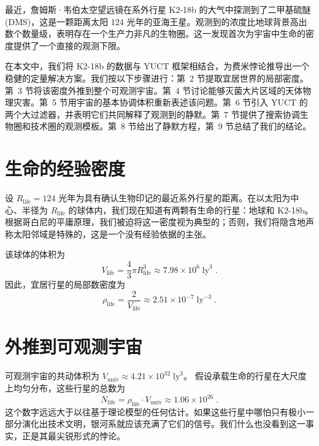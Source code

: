 \documentclass[11pt,a4paper]{article}
\begin{document}
	最近，詹姆斯·韦伯太空望远镜在系外行星 K2-18b 的大气中探测到了二甲基硫醚 (DMS)，这是一颗距离太阳 124 光年的亚海王星。观测到的浓度比地球背景高出数个数量级，表明存在一个生产力非凡的生物圈。这一发现首次为宇宙中生命的密度提供了一个直接的观测下限。
	
	在本文中，我们将 K2-18b 的数据与 YUCT 框架相结合，为费米悖论推导出一个稳健的定量解决方案。我们按以下步骤进行：第~2 节提取宜居世界的局部密度。第~3 节将该密度外推到整个可观测宇宙。第~4 节讨论能够灭菌大片区域的天体物理灾害。第~5 节用宇宙的基本协调体积重新表述该问题。第~6 节引入 YUCT 的两个大过滤器，并表明它们共同解释了观测到的静默。第~7 节提供了搜索协调生物圈和技术圈的观测模板。第~8 节给出了静默方程，第~9 节总结了我们的结论。
	
	\section{生命的经验密度}
	\label{sec:empirical}
	设 \(R_{\mathrm{life}} = 124\) 光年为具有确认生物印记的最近系外行星的距离。在以太阳为中心、半径为 \(R_{\mathrm{life}}\) 的球体内，我们现在知道有两颗有生命的行星：地球和 K2-18b。根据哥白尼的平庸原理，我们被迫将这一密度视为典型的；否则，我们将隐含地声称太阳邻域是特殊的，这是一个没有经验依据的主张。
	
	该球体的体积为
	\begin{equation}
		V_{\mathrm{life}} = \frac{4}{3}\pi R_{\mathrm{life}}^{3}
		\approx 7.98\times 10^{6}\;\mathrm{ly}^{3}\;.
	\end{equation}
	因此，宜居行星的局部数密度为
	\begin{equation}
		\rho_{\mathrm{life}} = \frac{2}{V_{\mathrm{life}}}
		\approx 2.51\times 10^{-7}\;\mathrm{ly}^{-3}\;.
	\end{equation}
	
	\section{外推到可观测宇宙}
	\label{sec:extrapolation}
	可观测宇宙的共动体积为
	\(V_{\mathrm{univ}} \approx 4.21\times 10^{32}\;\mathrm{ly}^{3}\)。
	假设承载生命的行星在大尺度上均匀分布，这些行星的总数为
	\begin{equation}
		\label{eq:N_life_total}
		N_{\mathrm{life}} = \rho_{\mathrm{life}} \cdot V_{\mathrm{univ}}
		\approx 1.06\times 10^{26}\; .
	\end{equation}
	这个数字远远大于以往基于理论模型的任何估计。如果这些行星中哪怕只有极小一部分演化出技术文明，银河系就应该充满了它们的信号。我们什么也没看到这一事实，正是其最尖锐形式的悖论。
	
\end{document}
